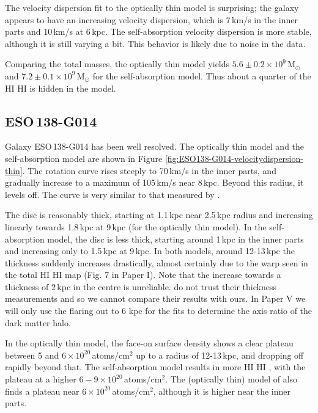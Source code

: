 \documentclass[useAMS,usenatbib]{mn2e}
\newcommand{\hi}{%
  \relax
  \ifmmode
    \textrm{\textsc{HI}}
  \else
    \textsc{H{\smaller}I}
  \fi
}
\begin{document}
The velocity dispersion fit to the optically thin model is 
surprising; the galaxy appears to have an increasing velocity 
dispersion, which is 7\,km/s in the inner parts and 10\,km/s at 6\,kpc.
The self-absorption velocity dispersion is more stable, although 
it is still varying a bit. 
This behavior is likely due to noise in the data.

Comparing the total masses, the optically thin model yields 
$5.6\pm0.2\times10^9$\,M$_\odot$ and $7.2\pm0.1\times10^9$\,M$_\odot$ 
for the self-absorption model.
Thus about a quarter of the \hi is hidden in the model.

\subsection{ESO\,138-G014}\label{sec:HIdecom138}
Galaxy ESO\,138-G014 has been well resolved.
The optically thin model and  the self-absorption 
model are shown in Figure \ref{fig:ESO138-G014-velocitydispersion-thin}.
The rotation curve rises steeply to 70\,km/s in the 
inner parts, and gradually increase to a maximum of 105\,km/s near 8\,kpc. 
Beyond this radius, it levels off.
The curve is very similar to that measured by \citet{OBrien2010C}.

The disc is reasonably thick, starting  at 1.1\,kpc 
near 2.5\,kpc radius and increasing linearly towards 
1.8\,kpc at 9\,kpc (for the optically thin model).
In the self-absorption model, the disc is less thick, 
starting around 1\,kpc in the inner parts and increasing 
only to 1.5\,kpc at 9\,kpc.
In both models, around 12-13\,kpc the thickness suddenly 
increases drastically, almost certainly due to the warp
seen in the total \hi map (Fig. 7 in Paper I).
Note that the increase towards a thickness of 2\,kpc in 
the centre is unreliable.
\citet{OBrien2010C} do not trust their thickness 
measurements and so we cannot compare their results with ours.
In Paper V we will only use the flaring 
out to 6 kpc for the fits to determine the axis ratio of the dark matter 
halo.

In the optically thin model, the face-on surface 
density shows a clear plateau between 5 and $6\times10^{20}$\,atoms/cm$^2$ 
up to a radius of 12-13\,kpc, and dropping off rapidly beyond that.
The self-absorption model results in more \hi, with the plateau at a 
higher $6-9\times10^{20}$\,atoms/cm$^2$.
The (optically thin) model of \citet{OBrien2010C} also finds a plateau 
near $6\times10^{20}$\,atoms/cm$^2$, although it is higher near the inner parts.
\end{document}
